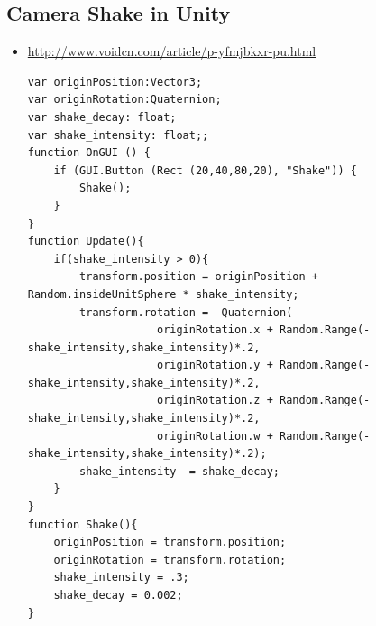 \documentclass[9pt, b5paper]{article}
\begin{document}
\subsection{Camera Shake in Unity}
\label{sec:org4bceb15}
\begin{itemize}
\item \url{http://www.voidcn.com/article/p-yfmjbkxr-pu.html}
\begin{verbatim}
var originPosition:Vector3;
var originRotation:Quaternion;
var shake_decay: float;
var shake_intensity: float;;
function OnGUI () {
    if (GUI.Button (Rect (20,40,80,20), "Shake")) {
        Shake();
    }
}
function Update(){
    if(shake_intensity > 0){
        transform.position = originPosition + Random.insideUnitSphere * shake_intensity;
        transform.rotation =  Quaternion(
                    originRotation.x + Random.Range(-shake_intensity,shake_intensity)*.2,
                    originRotation.y + Random.Range(-shake_intensity,shake_intensity)*.2,
                    originRotation.z + Random.Range(-shake_intensity,shake_intensity)*.2,
                    originRotation.w + Random.Range(-shake_intensity,shake_intensity)*.2);
        shake_intensity -= shake_decay;
    }
}
function Shake(){
    originPosition = transform.position;
    originRotation = transform.rotation;
    shake_intensity = .3;
    shake_decay = 0.002;
}
\end{verbatim}
\end{itemize}
\end{document}
